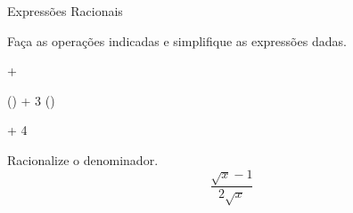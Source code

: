 \begin{exercicios}{Expressões Racionais}
    \begin{exercicio}
        Faça as operações indicadas e simplifique as expressões dadas.    
        \begin{mathlist}
            \item {} + 
            \item {} \left(\right) + 3 \left(\right)
            \item {} + 4
        \end{mathlist}    
        \begin{answers}
            \begin{mathlist}[2]
                \item {}
                \item {}
                \item {}
            \end{mathlist}
        \end{answers}
    \end{exercicio}
    
    \begin{exercicio}
        Racionalize o denominador.
        \[\frac{\sqrt{x} - 1}{2 \sqrt{x}}\]        
    \end{exercicio}
    
\end{exercicios}

